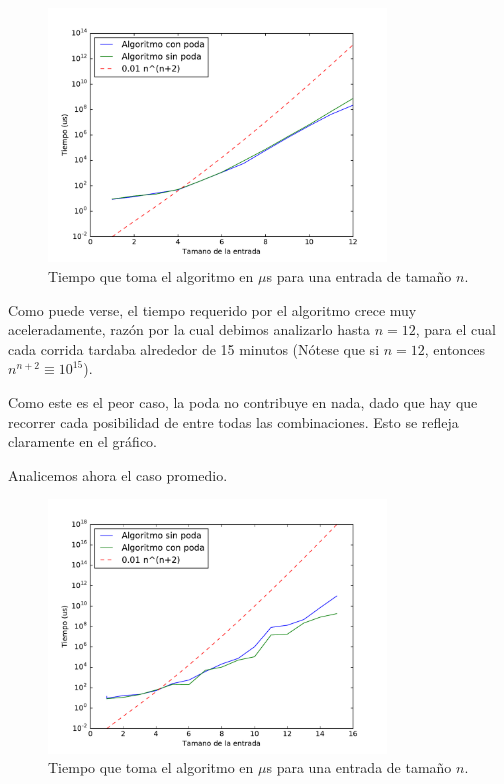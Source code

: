 \begin{figure}[H]
 \centering
	\includegraphics[width=0.8\textwidth]{img/tiempos/kamehameha1.pdf}
	\caption{\footnotesize Tiempo que toma el algoritmo en $\mu$s para una entrada de tamaño $n$.}
	\label{fig:kamehameha-tiempos1}
\end{figure}

Como puede verse, el tiempo requerido por el algoritmo crece muy aceleradamente, razón por la cual debimos analizarlo hasta $n = 12$, para el cual cada corrida tardaba alrededor de 15 minutos (Nótese que si $n = 12$, entonces $n^{n+2} \equiv 10^15$).

Como este es el peor caso, la poda no contribuye en nada, dado que hay que recorrer cada posibilidad de entre todas las combinaciones. Esto se refleja claramente en el gráfico.

Analicemos ahora el caso promedio.

\begin{figure}[H]
 \centering
	\includegraphics[width=0.8\textwidth]{img/tiempos/kamehameha2.pdf}
	\caption{\footnotesize Tiempo que toma el algoritmo en $\mu$s para una entrada de tamaño $n$.}
	\label{fig:kamehameha-tiempos2}
\end{figure}

